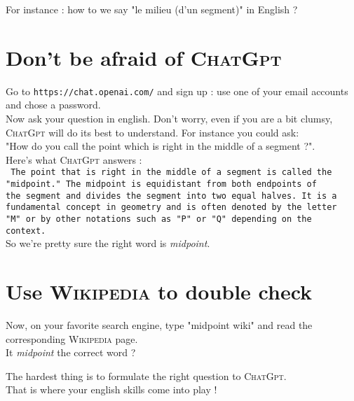 \documentclass[12pt,a4paper,article,english,firamath]{nsi}
\begin{document}
For instance : how to we say "le milieu (d'un segment)" in English ?

\section*{Don't be afraid of \textsc{ChatGpt}}

Go to \texttt{https://chat.openai.com/} and sign up : use one of your email accounts and chose a password.\\
Now ask your question in english. Don't worry, even if you are a bit clumsy, \textsc{ChatGpt} will do its best to understand. For instance you could ask:\\ "How do you call the point which is right in the middle of a segment ?".\\
Here's what \textsc{ChatGpt} answers :\\

\texttt{\noindent
    The point that is right in the middle of a segment is called the\\
    "midpoint." The midpoint is equidistant from both endpoints of \\
    the segment and divides the segment into two equal halves. It is
    a \\
    fundamental concept in geometry and is often denoted by the
    letter \\
    "M" or by other notations such as "P" or "Q" depending on
    the\\
    context.}\\

So we're pretty sure the right word is \textit{midpoint}.


\section*{Use \textsc{Wikipedia} to double check}

Now, on your favorite search engine, type "midpoint wiki" and read the corresponding \textsc{Wikipedia} page.\\
It \textit{midpoint} the correct word ?\\


\begin{remarque}
    The hardest thing is to formulate the right question to \textsc{ChatGpt}.\\
    That is where your english skills come into play !
\end{remarque}
\end{document}
